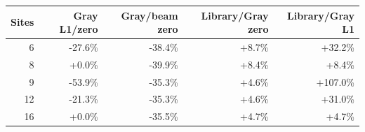 \begin{tabular}{rrrrr}
\toprule
Sites & Gray L1/zero & Gray/beam zero & Library/Gray zero & Library/Gray L1\\
\midrule
6 & -27.6\% & -38.4\% & +8.7\% & +32.2\%\\
8 & +0.0\% & -39.9\% & +8.4\% & +8.4\%\\
9 & -53.9\% & -35.3\% & +4.6\% & +107.0\%\\
12 & -21.3\% & -35.3\% & +4.6\% & +31.0\%\\
16 & +0.0\% & -35.5\% & +4.7\% & +4.7\%\\
\bottomrule
\end{tabular}
